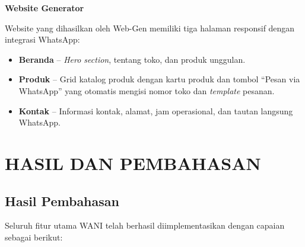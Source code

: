 \documentclass[12pt,a4paper,oneside]{article}
\newcommand{\bab}[1]{%
    \newpage
    \section{#1}%
}
\newcommand{\sub}[1]{%
    \subsection{#1}%
}
\begin{document}
\textbf{Website Generator}

Website yang dihasilkan oleh Web-Gen memiliki tiga halaman responsif dengan integrasi WhatsApp:
\begin{itemize}
	\item \textbf{Beranda} -- \textit{Hero section}, tentang toko, dan produk unggulan.
	\item \textbf{Produk} -- Grid katalog produk dengan kartu produk dan tombol ``Pesan via WhatsApp'' yang otomatis mengisi nomor toko dan \textit{template} pesanan.
	\item \textbf{Kontak} -- Informasi kontak, alamat, jam operasional, dan tautan langsung WhatsApp.
\end{itemize}

\bab{HASIL DAN PEMBAHASAN}

\sub{Hasil Pembahasan}

Seluruh fitur utama WANI telah berhasil diimplementasikan dengan capaian sebagai berikut:
\end{document}

